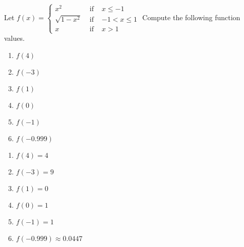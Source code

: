 {Let ${\displaystyle f(x) = \left\{ \begin{array}{rcr}
x^{2} & \mbox{ if } & x \leq -1\\
\sqrt{1 - x^{2}} & \mbox{ if } & -1 < x \leq 1\\
x & \mbox{ if } & x > 1  \end{array} \right. }$  Compute the following function values.
\begin{multicols}{2}
\begin{enumerate}
\item $f(4)$
\item $f(-3)$
\item $f(1)$
\item $f(0)$
\item $f(-1)$
\item $f(-0.999)$
\end{enumerate}
\end{multicols}
}
{\begin{enumerate}
\item $f(4) = 4$
\item $f(-3) = 9$
\item $f(1) = 0$
\item $f(0) = 1$
\item $f(-1) = 1$
\item $f(-0.999) \approx 0.0447$
\end{enumerate}}
